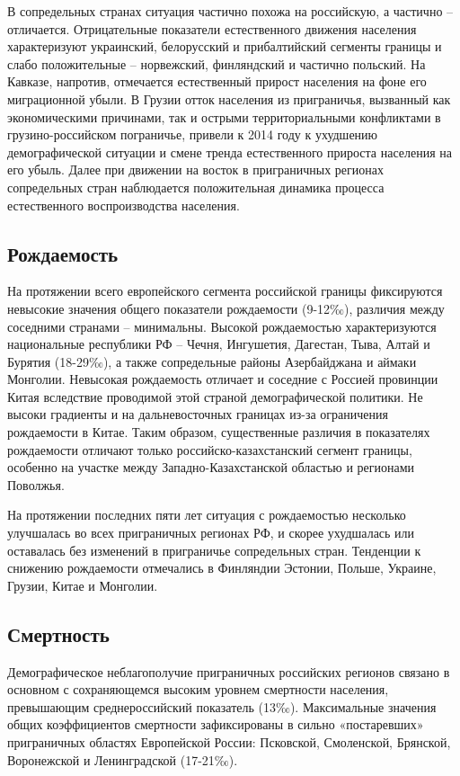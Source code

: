 \documentclass[]{book}
\begin{document}
В сопредельных странах ситуация частично похожа на российскую, а
частично -- отличается. Отрицательные показатели естественного движения
населения характеризуют украинский, белорусский и прибалтийский сегменты
границы и слабо положительные -- норвежский, финляндский и частично
польский. На Кавказе, напротив, отмечается естественный прирост
населения на фоне его миграционной убыли. В Грузии отток населения из
приграничья, вызванный как экономическими причинами, так и острыми
территориальными конфликтами в грузино-российском пограничье, привели к
2014 году к ухудшению демографической ситуации и смене тренда
естественного прироста населения на его убыль. Далее при движении на
восток в приграничных регионах сопредельных стран наблюдается
положительная динамика процесса естественного воспроизводства населения.

\subsection{Рождаемость}\label{demo-situ-bir}

На протяжении всего европейского сегмента российской границы фиксируются
невысокие значения общего показатели рождаемости (9-12‰), различия между
соседними странами -- минимальны. Высокой рождаемостью характеризуются
национальные республики РФ -- Чечня, Ингушетия, Дагестан, Тыва, Алтай и
Бурятия (18-29‰), а также сопредельные районы Азербайджана и аймаки
Монголии. Невысокая рождаемость отличает и соседние с Россией провинции
Китая вследствие проводимой этой страной демографической политики. Не
высоки градиенты и на дальневосточных границах из-за ограничения
рождаемости в Китае. Таким образом, существенные различия в показателях
рождаемости отличают только российско-казахстанский сегмент границы,
особенно на участке между Западно-Казахстанской областью и регионами
Поволжья.

На протяжении последних пяти лет ситуация с рождаемостью несколько
улучшалась во всех приграничных регионах РФ, и скорее ухудшалась или
оставалась без изменений в приграничье сопредельных стран. Тенденции к
снижению рождаемости отмечались в Финляндии Эстонии, Польше, Украине,
Грузии, Китае и Монголии.

\subsection{Смертность}\label{demo-situ-dea}

Демографическое неблагополучие приграничных российских регионов связано
в основном с сохраняющемся высоким уровнем смертности населения,
превышающим среднероссийский показатель (13‰). Максимальные значения
общих коэффициентов смертности зафиксированы в сильно «постаревших»
приграничных областях Европейской России: Псковской, Смоленской,
Брянской, Воронежской и Ленинградской (17-21‰).
\end{document}
